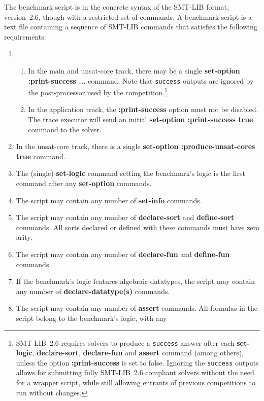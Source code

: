 \documentclass[12pt]{article}
\newcommand{\akey}[1]{\textbf{#1}}
\begin{document}
The benchmark script is in the concrete syntax of the SMT-LIB format,
version~2.6, though with a restricted set of commands.  A benchmark
script is a text file containing a sequence of SMT-LIB commands that
satisfies the following requirements:
%
\begin{enumerate}
\item
  \begin{enumerate}
  \item In the main and unsat-core track, there may be a single
    \akey{set-option :print-success ...} command.  Note that
    \texttt{success} outputs are ignored by the post-processor used by
    the competition.\footnote{SMT-LIB~2.6 requires solvers to produce
      a \texttt{success} answer after each \akey{set-logic},
      \akey{declare-sort}, \akey{declare-fun} and \akey{assert}
      command (among others), unless the option \akey{:print-success}
      is set to false.  Ignoring the \texttt{success} outputs allows
      for submitting fully SMT-LIB~2.6 compliant solvers without the
      need for a wrapper script, while still allowing entrants of
      previous competitions to run without changes.}
  \item In the application track, the \akey{:print-success} option
    must not be disabled.  The trace executor will send an initial
    \akey{set-option :print-success true} command to the solver.
  \end{enumerate}
\item In the unsat-core track, there is a single \akey{set-option
  :produce-unsat-cores true} command.
\item The (single) \akey{set-logic} command setting the benchmark's
  logic is the first command after any \akey{set-option} commands.
\item The script may contain any number of \akey{set-info} commands.
\item The script may contain any number of \akey{declare-sort} and
  \akey{define-sort} commands.  All sorts declared or defined with
  these commands must have zero arity.
\item The script may contain any number of \akey{declare-fun} and
  \akey{define-fun} commands.
\item If the benchmark's logic features algebraic datatypes, the
  script may contain any number of \akey{declare-datatype(s)}
  commands.
\item The script may contain any number of \akey{assert} commands.
  All formulas in the script belong to the benchmark's logic, with any

\end{enumerate}
\end{document}
